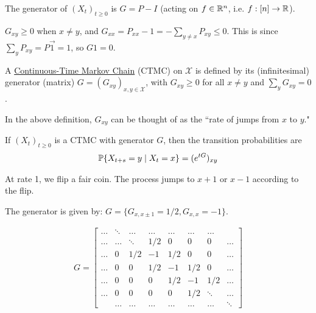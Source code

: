 \documentclass[12pt]{article}
\begin{document}
\begin{coro}
	The generator of $(X_t)_{t\geq0}$ is $G = P-I$ (acting on $f\in\R^n$, i.e. $f:[n]\rightarrow\R$).
\end{coro}

\begin{note} $G_{xy}\geq 0$ when $x\neq y$,
and $G_{xx}=P_{xx}-1 = -\sum_{y\neq x} P_{xy} \leq 0$. This is since $\sum_y P_{xy}=P\vec{1}=1$, so $G1=0$.
\end{note}

\begin{defn}
	A \underline{Continuous-Time Markov Chain} (CTMC) on $\mathcal{X}$ is defined by its (infinitesimal) generator (matrix) $G = (G_{xy})_{x,y\in \mathcal{X}}$, with $G_{xy}\geq 0$ for all $x\neq y$ and $\sum_y G_{xy}=0$.
\end{defn}

\begin{note} In the above definition, $G_{xy}$ can be thought of as the ``rate of jumps from $x$ to $y$." \end{note}

\noindent If $(X_t)_{t\geq 0}$ is a CTMC with generator $G$, then the transition probabilities are
$$\begin{aligned} \P\{X_{t+s}=y \mid X_t=x\} = (e^{tG})_{xy} \end{aligned}$$

\begin{exmp}
At rate 1, we flip a fair coin. The process jumps to $x+1$ or $x-1$ according to the flip.

The generator is given by: $G = \{ G_{x,x\pm 1} = 1/2, G_{x,x} = -1 \}$.

$$\begin{aligned}
G = \begin{bmatrix}
 \hdots & \ddots & \hdots & \hdots & \hdots & \hdots & \hdots  \\
\hdots & \hdots & \ddots & 1/2 & 0 & 0 & 0 & \hdots \\
\hdots & 0 & 1/2 & -1 & 1/2 & 0 & 0 & \hdots \\
\hdots & 0 & 0 & 1/2 & -1 & 1/2 & 0 & \hdots\\
\hdots & 0 & 0 & 0 & 1/2 & -1 & 1/2 & \hdots \\
\hdots & 0 & 0 & 0 & 0 & 1/2 & \ddots & \hdots \\
 & \hdots & \hdots & \hdots & \hdots & \hdots & \hdots & \ddots
\end{bmatrix}
\end{aligned}$$

\end{exmp}
\end{document}
